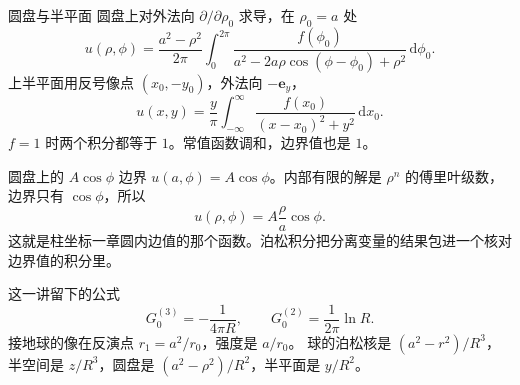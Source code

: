 \documentclass[fontset=windows, chinese, 10pt, xcolor=dvipsnames]{beamer}
\begin{document}
\begin{frame}{圆盘与半平面}
  圆盘上对外法向 $\partial/\partial\rho_0$ 求导，在 $\rho_0=a$ 处
  \[
    u(\rho,\phi)
    =\frac{a^2-\rho^2}{2\pi}\int_0^{2\pi}
      \frac{f(\phi_0)}
           {a^2-2a\rho\cos(\phi-\phi_0)+\rho^2}
      \,\mathrm{d}\phi_0.
  \]
  上半平面用反号像点 $(x_0,-y_0)$，外法向 $-\mathbf{e}_y$，
  \[
    u(x,y)
    =\frac{y}{\pi}\int_{-\infty}^{\infty}
      \frac{f(x_0)}{(x-x_0)^2+y^2}\,\mathrm{d}x_0.
  \]
  $f=1$ 时两个积分都等于 $1$。常值函数调和，边界值也是 $1$。
\end{frame}

\begin{frame}{圆盘上的 $A\cos\phi$}
  边界 $u(a,\phi)=A\cos\phi$。内部有限的解是 $\rho^{n}$ 的傅里叶级数，边界只有 $\cos\phi$，所以
  \[
    u(\rho,\phi)=A\frac{\rho}{a}\cos\phi.
  \]
  这就是柱坐标一章圆内边值的那个函数。泊松积分把分离变量的结果包进一个核对边界值的积分里。
\end{frame}

\begin{frame}{这一讲留下的公式}
  \[
    G_0^{(3)}=-\frac{1}{4\pi R},
    \qquad
    G_0^{(2)}=\frac{1}{2\pi}\ln R.
  \]
  接地球的像在反演点 $r_1=a^2/r_0$，强度是 $a/r_0$。
  \vspace{0.35em}
  球的泊松核是 $(a^2-r^2)/R^3$，半空间是 $z/R^3$，圆盘是 $(a^2-\rho^2)/R^2$，半平面是 $y/R^2$。
\end{frame}
\end{document}
